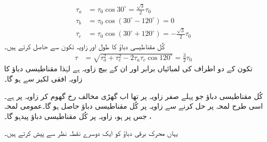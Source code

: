 %
\begin{gather}
\begin{aligned}
\tau_a&=\tau_0 \cos 30^{\circ}=\frac{\sqrt{3}}{2} \tau_0\\
\tau_b&=\tau_0 \cos (30^{\circ}-120^{\circ})=0\\
\tau_c&=\tau_0 \cos (30^{\circ}+120^{\circ})=-\frac{\sqrt{3}}{2} \tau_0
\end{aligned}
\end{gather}
%
کُل مقناطیسی دباؤ کا طول   اور زاویہ تکون  سے حاصل کرتے ہیں۔
\begin{align}
\tau&=\sqrt{\tau_a^2+\tau_c^2-2 \tau_a \tau_c \cos 120^{\circ}}=\frac{3}{2}\tau_0
\end{align}
تکون کے دو اطراف کی لمبائیاں برابر  اور ان کے بیچ زاویہ  ہے  لہٰذا مقناطیسی دباؤ کا زاویہ افقی لکیر سے   ہو گا۔

کُل مقناطیسی دباؤ جو پہلے صفر زاویہ پر تھا اب  گھڑی   مخالف رخ گھوم کر   زاویہ پر ہے۔ اسی طرح لمحہ   پر حل کرنے سے   زاویہ      پر کُل مقناطیسی دباؤ    حاصل ہو گا۔عمومی لمحہ ، جس پر    ہو، زاویہ   پر  کُل مقناطیسی دباؤ    پیدہو گا۔

یہاں محرک برقی دباؤ کو  ایک دوسرے نقطہ نظر سے پیش کرتے ہیں۔

